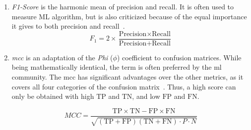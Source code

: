 \begin{enumerate}[(1)]
  \item \emph{F1-Score} is the harmonic mean of precision and recall.
  It is often used to measure ML algorithm, but is also criticized because of the equal importance it gives to both precision and recall~\cite{hand_noteusingFmeasure_2018}.
  \begin{equation*}
    F_1 = 2 \times \frac{\text{Precision} \times \text{Recall}}{\text{Precision}+\text{Recall}}
  \end{equation*}

  \item \emph{\gls{mcc}} is an adaptation of the \emph{Phi} (\(\phi\)) coefficient to confusion matrices.
  While being mathematically identical, the term is often preferred by the \gls{ml} community.
  The \gls{mcc} has significant advantages over the other metrics, as it covers all four categories of the confusion matrix~\cite{chicco_advantagesMatthewscorrelation_2020}.
  Thus, a high score can only be obtained with high \(\text{TP}\) and \(\text{TN}\), and low \(\text{FP}\) and \(\text{FN}\).

  \begin{equation*}
      MCC = \dfrac{
        \text{TP} \times \text{TN} - \text{FP} \times \text{FN}
      }{
        \sqrt{(\text{TP} + \text{FP})(\text{TN} + \text{FN})\cdot P \cdot N}
      }
  \end{equation*}%

\end{enumerate}
